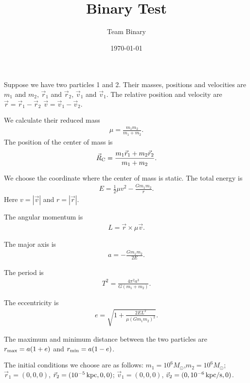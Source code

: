 \documentclass[a4paper,12pt]{article}
\title{Binary Test}
\author{Team Binary}
\date{\today}
\begin{document}
\maketitle
Suppose we have two particles 1 and 2. Their masses, positions and velocities are $m_1$ and $m_2$, $\vec{r}_1$ and $\vec{r}_2$, $\vec{v}_1$ and $\vec{v}_1$. The relative position and velocity are $\vec{r}=\vec{r}_1-\vec{r}_2$ $\vec{v}=\vec{v}_1-\vec{v}_2$.

We calculate their reduced mass 
\begin{align}
    \mu=\frac{m_1 m_2}{m_1 +m_2}.
\end{align} 
The position of the center of mass is 
\begin{align}
    \vec{R}_{\rm C}=\frac{m_1 \vec{r}_1+m_2 \vec{r}_2}{m_1+m_2}.
\end{align}

We choose the coordinate where the center of mass is static.
The total energy is 
\begin{align}
     E=\frac{1}{2}\mu v^2-\frac{G m_1 m_2}{r}.
\end{align}
Here $v=|\vec{v}|$ and $r=|\vec{r}|$.

The angular momentum is 
\begin{align}
    L=\vec{r}\times \mu \vec{v}.
\end{align}

The major axis is
\begin{align}
    a=-\frac{G m_1 m_2}{2E}.
\end{align}

The period is 
\begin{align}
    T^2=\frac{4 \pi^2 a^3}{G(m_1+m_2)}.
\end{align}
    
The eccentricity is 
\begin{align}
    e=\sqrt{1+\frac{2EL^2}{\mu(Gm_1m_2)^2}}.
\end{align}

The maximum and minimum distance between the two particles are $r_{\rm max}=a(1+e)$ and $r_{\rm min}=a(1-e)$.

The initial conditions we choose are as follows:
$m_1=10^{6}M_{\odot}$,$m_2=10^{6}M_{\odot}$; $\vec{r}_1=(0,0,0)$, $\vec{r}_2=(10^{-5}\,{\rm kpc},0,0)$; $\vec{v}_1=(0,0,0)$, $\vec{v}_2=(0, 10^{-6}\, {\rm kpc/s},0)$.
\end{document}
